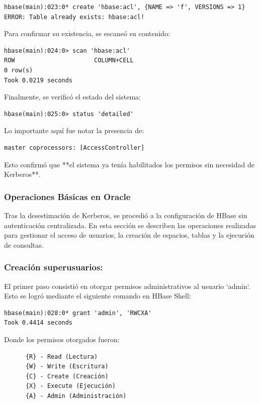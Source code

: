\documentclass{article}
\begin{document}
\begin{lstlisting}[style=bashStyle]
hbase(main):023:0* create 'hbase:acl', {NAME => 'f', VERSIONS => 1}
ERROR: Table already exists: hbase:acl!
\end{lstlisting}

Para confirmar su existencia, se escaneó su contenido:

\begin{lstlisting}[style=bashStyle]
hbase(main):024:0> scan 'hbase:acl'
ROW                      COLUMN+CELL
0 row(s)
Took 0.0219 seconds
\end{lstlisting}

Finalmente, se verificó el estado del sistema:

\begin{lstlisting}[style=bashStyle]
hbase(main):025:0> status 'detailed'
\end{lstlisting}

Lo importante aquí fue notar la presencia de:

\begin{verbatim}
master coprocessors: [AccessController]
\end{verbatim}

Esto confirmó que **el sistema ya tenía habilitados los permisos sin necesidad de Kerberos**.

\subsubsection{Operaciones Básicas en Oracle}

Tras la desestimación de Kerberos, se procedió a la configuración de HBase sin autenticación centralizada. En esta sección se describen las operaciones realizadas para gestionar el acceso de usuarios, la creación de espacios, tablas y la ejecución de consultas.

\subsubsection{Creación superusuarios:}
El primer paso consistió en otorgar permisos administrativos al usuario `admin`. Esto se logró mediante el siguiente comando en HBase Shell:

\begin{lstlisting}[style=bashStyle]
hbase(main):028:0* grant 'admin', 'RWCXA'
Took 0.4414 seconds
\end{lstlisting}

Donde los permisos otorgados fueron:
\begin{verbatim}
      {R} - Read (Lectura)
      {W} - Write (Escritura)
      {C} - Create (Creación)
      {X} - Execute (Ejecución)
      {A} - Admin (Administración)
\end{verbatim}
\end{document}
